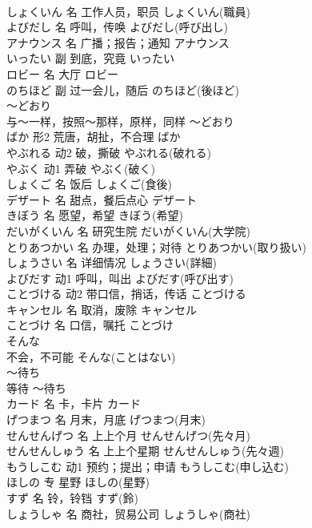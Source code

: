 \documentclass[8pt]{extreport}
\begin{document}
\begin{CJK}{UTF8}{min}
\\	しょくいん	名	工作人员，职员	しょくいん(職員)	
\\	よびだし	名	呼叫，传唤	よびだし(呼び出し)	
\\	アナウンス	名	广播；报告；通知	アナウンス	
\\	いったい	副	到底，究竟	いったい	
\\	ロビー	名	大厅	ロビー	
\\	のちほど	副	过一会儿，随后	のちほど(後ほど)	
\\	～どおり	
\\	与～一样，按照～那样，原样，同样	～どおり	
\\	ばか	形2	荒唐，胡扯，不合理	ばか	
\\	やぶれる	动2	破，撕破	やぶれる(破れる)	
\\	やぶく	动1	弄破	やぶく(破く)	
\\	しょくご	名	饭后	しょくご(食後)	
\\	デザート	名	甜点，餐后点心	デザート	
\\	きぼう	名	愿望，希望	きぼう(希望)	
\\	だいがくいん	名	研究生院	だいがくいん(大学院)	
\\	とりあつかい	名	办理，处理；对待	とりあつかい(取り扱い)	
\\	しょうさい	名	详细情况	しょうさい(詳細)	
\\	よびだす	动1	呼叫，叫出	よびだす(呼び出す)	
\\	ことづける	动2	带口信，捎话，传话	ことづける	
\\	キャンセル	名	取消，废除	キャンセル	
\\	ことづけ	名	口信，嘱托	ことづけ	
\\	そんな	
\\	不会，不可能	そんな(ことはない)	
\\	～待ち	
\\	等待	～待ち	
\\	カード	名	卡，卡片	カード	
\\	げつまつ	名	月末，月底	げつまつ(月末)	
\\	せんせんげつ	名	上上个月	せんせんげつ(先々月)	
\\	せんせんしゅう	名	上上个星期	せんせんしゅう(先々週)	
\\	もうしこむ	动1	预约；提出；申请	もうしこむ(申し込む)	
\\	ほしの	专	星野	ほしの(星野)	
\\	すず	名	铃，铃铛	すず(鈴)	
\\	しょうしゃ	名	商社，贸易公司	しょうしゃ(商社)	

\end{CJK}
\end{document}
